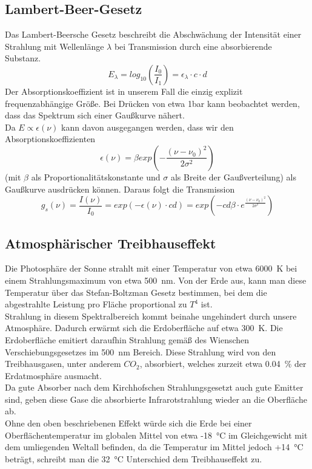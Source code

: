\documentclass{article}
\begin{document}
    \subsection{Lambert-Beer-Gesetz}
        Das Lambert-Beersche Gesetz beschreibt die Abschwächung der Intensität einer Strahlung mit Wellenlänge
        $\lambda$ bei Transmission durch eine absorbierende Substanz.
        \begin{equation}
            E_{\lambda} = log_{10}(\frac{I_0}{I_1}) = \epsilon_{\lambda} \cdot c \cdot d
        \end{equation}
        Der Absorptionskoeffizient ist in unserem Fall die einzig explizit frequenzabhängige Größe. Bei Drücken
        von etwa 1bar kann beobachtet werden, dass das Spektrum sich einer Gaußkurve nähert.\\
        Da $E \propto \epsilon(\nu)$ kann davon ausgegangen werden, dass wir den Absorptionskoeffizienten 
        $$\epsilon(\nu) = \beta exp(-\frac{(\nu - \nu_0)^2}{2\sigma^2})$$
        (mit $\beta$ als Proportionalitätskonstante und $\sigma$ als Breite der Gaußverteilung) als Gaußkurve ausdrücken
        können. Daraus folgt die Transmission
        \begin{equation}
            g_s(\nu) = \frac{I(\nu)}{I_0} = exp(-\epsilon(\nu)\cdot cd) = exp(-cd\beta\cdot e^{\frac{(\nu-\nu_0)^2}{2\sigma^2}})
        \end{equation}
    
    \subsection{Atmosphärischer Treibhauseffekt}
        Die Photosphäre der Sonne strahlt mit einer Temperatur von etwa 6000~K bei einem Strahlungsmaximum
        von etwa 500~nm. Von der Erde aus, kann man diese Temperatur über das Stefan-Boltzman Gesetz bestimmen, bei
        dem die abgestrahlte Leistung pro Fläche proportional zu $T^4$ ist.\\
        Strahlung in diesem Spektralbereich kommt beinahe ungehindert durch unsere Atmosphäre. Dadurch erwärmt
        sich die Erdoberfläche auf etwa 300~K. Die Erdoberfläche emitiert daraufhin Strahlung gemäß des Wienschen Verschiebungsgesetzes
        im 500~nm Bereich. Diese Strahlung wird von den Treibhausgasen, unter anderem $CO_2$, absorbiert, welches zurzeit
        etwa 0.04~\% der Erdatmosphäre ausmacht.\\
        Da gute Absorber nach dem Kirchhofschen Strahlungsgesetzt auch gute Emitter sind, geben diese Gase die 
        absorbierte Infrarotstrahlung wieder an die Oberfläche ab.\\
        Ohne den oben beschriebenen Effekt würde sich die Erde bei einer Oberflächentemperatur im globalen Mittel von
        etwa -18~°C im Gleichgewicht mit dem umliegenden Weltall befinden, da die Temperatur im Mittel jedoch +14~°C
        beträgt, schreibt man die 32~°C Unterschied dem Treibhauseffekt zu.
\end{document}
